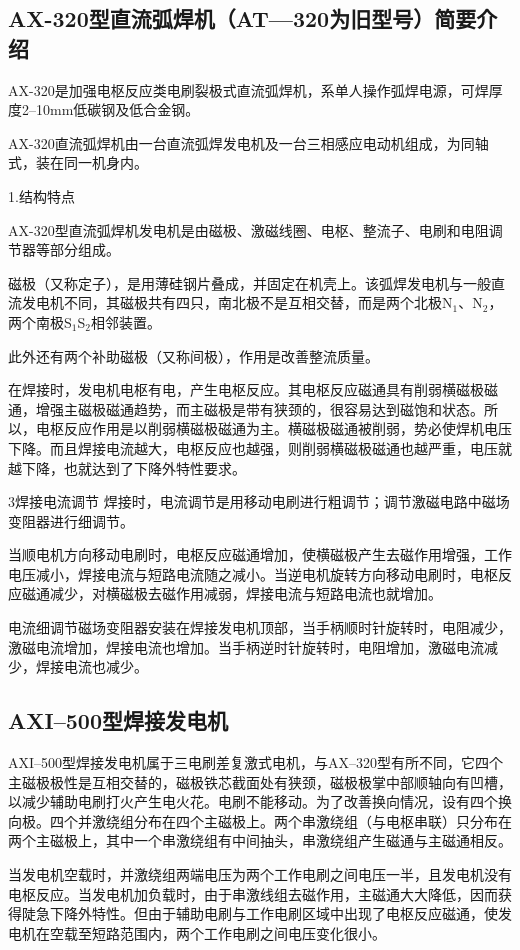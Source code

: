 \documentclass{ctexbook}
\begin{document}
\subsection{AX-320型直流弧焊机（AT—320为旧型号）简要介绍} 
AX-320是加强电枢反应类电刷裂极式直流弧焊机，系单人操作弧焊电源，可焊厚度2--10mm低碳钢及低合金钢。

AX-320直流弧焊机由一台直流弧焊发电机及一台三相感应电动机组成，为同轴式，装在同一机身内。

1.结构特点

AX-320型直流弧焊机发电机是由磁极、激磁线圈、电枢、整流子、电刷和电阻调节器等部分组成。

磁极（又称定子），是用薄硅钢片叠成，并固定在机壳上。该弧焊发电机与一般直流发电机不同，其磁极共有四只，南北极不是互相交替，而是两个北极N$_1$、N$_2$，两个南极S$_1$S$_2$相邻装置。

此外还有两个补助磁极（又称间极），作用是改善整流质量。

在焊接时，发电机电枢有电，产生电枢反应。其电枢反应磁通具有削弱横磁极磁通，增强主磁极磁通趋势，而主磁极是带有狭颈的，很容易达到磁饱和状态。所以，电枢反应作用是以削弱横磁极磁通为主。横磁极磁通被削弱，势必使焊机电压下降。而且焊接电流越大，电枢反应也越强，则削弱横磁极磁通也越严重，电压就越下降，也就达到了下降外特性要求。

3焊接电流调节
焊接时，电流调节是用移动电刷进行粗调节；调节激磁电路中磁场变阻器进行细调节。

当顺电机方向移动电刷时，电枢反应磁通增加，使横磁极产生去磁作用增强，工作电压减小，焊接电流与短路电流随之减小。当逆电机旋转方向移动电刷时，电枢反应磁通减少，对横磁极去磁作用减弱，焊接电流与短路电流也就增加。

电流细调节磁场变阻器安装在焊接发电机顶部，当手柄顺时针旋转时，电阻减少，激磁电流增加，焊接电流也增加。当手柄逆时针旋转时，电阻增加，激磁电流减少，焊接电流也减少。
\subsection{AXI--500型焊接发电机}
AXI--500型焊接发电机属于三电刷差复激式电机，与AX--320型有所不同，它四个主磁极极性是互相交替的，磁极铁芯截面处有狭颈，磁极极掌中部顺轴向有凹槽，以减少辅助电刷打火产生电火花。电刷不能移动。为了改善换向情况，设有四个换向极。四个并激绕组分布在四个主磁极上。两个串激绕组（与电枢串联）只分布在两个主磁极上，其中一个串激绕组有中间抽头，串激绕组产生磁通与主磁通相反。

当发电机空载时，并激绕组两端电压为两个工作电刷之间电压一半，且发电机没有电枢反应。当发电机加负载时，由于串激线组去磁作用，主磁通大大降低，因而获得陡急下降外特性。但由于辅助电刷与工作电刷区域中出现了电枢反应磁通，使发电机在空载至短路范围内，两个工作电刷之间电压变化很小。
\end{document}

